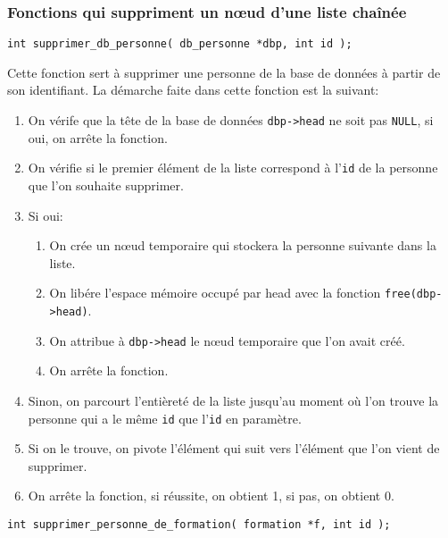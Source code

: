 \documentclass[10pt]{article}
\begin{document}
\subsubsection{Fonctions qui suppriment un n\oe{}ud d'une liste chaînée}

\begin{lstlisting}[firstnumber=216]
  int supprimer_db_personne( db_personne *dbp, int id );
\end{lstlisting}

Cette fonction sert à supprimer une personne de la base de données à partir de son identifiant. La démarche faite dans cette fonction est la suivant:
\begin{enumerate}
\item On vérife que la tête de la base de données \texttt{dbp->head} ne soit pas \texttt{NULL}, si oui, on arrête la fonction.
\item On vérifie si le premier élément de la liste correspond à l'\texttt{id} de la personne que l'on souhaite supprimer.
\item Si oui:
  \begin{enumerate}
  \item On crée un n\oe{}ud temporaire qui stockera la personne suivante dans la liste.
  \item On libére l'espace mémoire occupé par head avec la fonction \texttt{free(dbp->head)}.
  \item On attribue à \texttt{dbp->head} le n\oe{}ud temporaire que l'on avait créé.
  \item On arrête la fonction.
  \end{enumerate}
\item Sinon, on parcourt l'entièreté de la liste jusqu'au moment où l'on trouve la personne qui a le même \texttt{id} que l'\texttt{id} en paramètre.
\item Si on le trouve, on pivote l'élément qui suit vers l'élément que l'on vient de supprimer.
\item On arrête la fonction, si réussite, on obtient 1, si pas, on obtient 0.
\end{enumerate}

\begin{lstlisting}[firstnumber=361]
  int supprimer_personne_de_formation( formation *f, int id );
\end{lstlisting}
\end{document}
